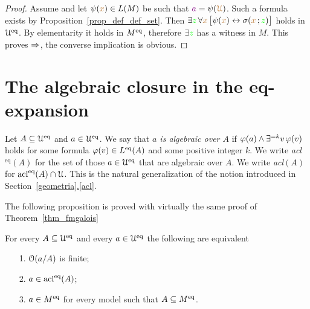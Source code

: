 \documentclass[creche.tex]{subfiles}
\begin{document}
\begin{proof}
Assume  and let $\psi({\color{brown} x})\in L(M)$ be such that ${\color{violet} a}=\psi({\color{brown}\EuScript U})$. Such a formula exists by Proposition~\ref{prop_def_def_set}. Then $\exists{\color{green}z}\,\forall{\color{brown}x}\,\big[\psi({\color{brown} x})\leftrightarrow\sigma({\color{brown} x}\,;{\color{green} z})\big]$ holds in $\EuScript U^{{\rm eq}}$. By elementarity it holds in $M^{{\rm eq}}$, therefore $\exists{\color{green}z}$ has a witness in $M$. This proves $\Rightarrow$, the converse implication is obvious.
\end{proof}

\section{The algebraic closure in the eq-expansion}

Let $A\subseteq\EuScript U^{{\rm eq}}$ and $a\in\EuScript U^{{\rm eq}}$. We say that \emph{$a$ is algebraic over $A$\/} if $\varphi(a)\wedge\exists^{=k}v\,\varphi(v)$ holds for some formula $\varphi(v)\in L^{{\rm eq}}(A)$ and some positive integer $k$. We write \emph{acl$^\textrm{eq}(A)$\/} for the set of those $a\in\EuScript U^{{\rm eq}}$ that are algebraic over $A$. We write \emph{acl$(A)$\/} for $\mathop{\rm acl}^{{\rm eq}}(A)\cap\EuScript U$. This is the natural generalization of the notion introduced in Section~\hyperref[acl]{\ref*{geometria}.\ref*{acl}}.


The following proposition is proved with virtually the same proof of Theorem~\ref{thm_fmgalois}

\begin{theorem}\label{thm_Galois_alg=alg}
For every $A\subseteq\EuScript U^{{\rm eq}}$ and every $a\in\EuScript U^{{\rm eq}}$ the following are equivalent
\begin{itemize}
\item[1.] $\EuScript O(a/A)$ is finite;
\item[2.] $a\in\mathop{\rm acl}^{{\rm eq}}(A)$;
\item[3.] $a\in M^{{\rm eq}}$ for every model such that $A\subseteq M^{{\rm eq}}$.\QED
\end{itemize}
\end{theorem}
\end{document}
